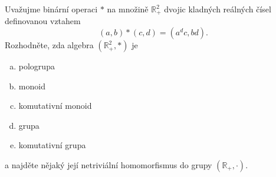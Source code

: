 Uvažujme binární operaci $*$ na množině $\mathbb{R}_{+}^{2}$ dvojic kladných
reálných čísel definovanou vztahem $$(a,b) * (c,d) = (a^{d}c,bd).$$ Rozhodněte,
zda algebra $(\mathbb{R}_{+}^{2},*)$ je 

\begin{enumerate}[a)]
  \item pologrupa
  \item monoid
  \item komutativní monoid
  \item grupa
  \item komutativní grupa
\end{enumerate}
a najděte nějaký její netriviální homomorfismus do grupy $(\mathbb{R}_{+},\cdot )$.
